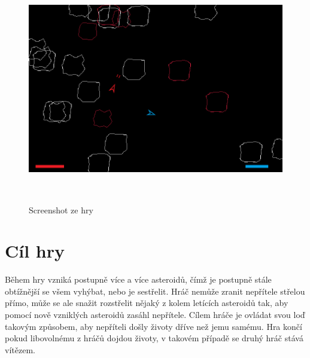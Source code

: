 \begin{figure}[p]

\includegraphics[width=150mm, height=100mm]{./Obrazky/UkazkaHry.png}
\caption{Screenshot ze hry}
\label{obr01:}
\end{figure}


\section{Cíl hry}
Během hry vzniká postupně více a více asteroidů, čímž je postupně stále obtížnější se všem vyhýbat, nebo je sestřelit.
Hráč nemůže zranit nepřítele střelou přímo, může se ale snažit rozstřelit nějaký z kolem letících asteroidů tak, aby pomocí nově vzniklých asteroidů zasáhl nepřítele.
Cílem hráče je ovládat svou loď takovým způsobem, aby nepříteli došly životy dříve než jemu samému. Hra končí pokud libovolnému z hráčů dojdou životy, v takovém případě se druhý hráč stává vítězem.

